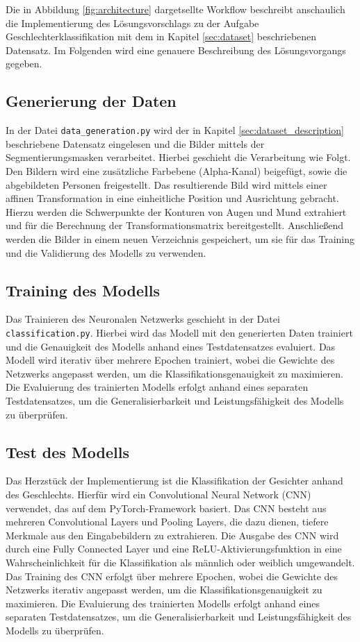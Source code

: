 \documentclass[journal,twoside,web]{ieeecolor}
\begin{document}
Die in Abbildung \ref{fig:architecture} dargetsellte Workflow beschreibt anschaulich die Implementierung des Lösungsvorschlags zu der Aufgabe Geschlechterklassifikation mit dem in Kapitel \ref{sec:dataset} beschriebenen Datensatz.
Im Folgenden wird eine genauere Beschreibung des Lösungsvorgangs gegeben.

\subsection{Generierung der Daten}
In der Datei \texttt{data\_generation.py} wird der in Kapitel \ref{sec:dataset_description} beschriebene Datensatz eingelesen und die Bilder mittels der Segmentierungsmasken verarbeitet. Hierbei geschieht die Verarbeitung wie Folgt. Den Bildern wird eine zusätzliche Farbebene (Alpha-Kanal) beigefügt, sowie die abgebildeten Personen freigestellt. Das resultierende Bild wird mittels einer affinen Transformation in eine einheitliche Position und Ausrichtung gebracht. Hierzu werden die Schwerpunkte der Konturen von Augen und Mund extrahiert und für die Berechnung der Transformationsmatrix bereitgestellt. Anschließend werden die Bilder in einem neuen Verzeichnis gespeichert, um sie für das Training und die Validierung des Modells zu verwenden.


\subsection{Training des Modells}
Das Trainieren des Neuronalen Netzwerks geschieht in der Datei \texttt{classification.py}. Hierbei wird das Modell mit den generierten Daten trainiert und die Genauigkeit des Modells anhand eines Testdatensatzes evaluiert. Das Modell wird iterativ über mehrere Epochen trainiert, wobei die Gewichte des Netzwerks angepasst werden, um die Klassifikationsgenauigkeit zu maximieren. Die Evaluierung des trainierten Modells erfolgt anhand eines separaten Testdatensatzes, um die Generalisierbarkeit und Leistungsfähigkeit des Modells zu überprüfen.

\subsection{Test des Modells}
Das Herzstück der Implementierung ist die Klassifikation der Gesichter anhand des Geschlechts. Hierfür wird ein Convolutional Neural Network (CNN) verwendet, das auf dem PyTorch-Framework basiert. Das CNN besteht aus mehreren Convolutional Layers und Pooling Layers, die dazu dienen, tiefere Merkmale aus den Eingabebildern zu extrahieren. Die Ausgabe des CNN wird durch eine Fully Connected Layer und eine ReLU-Aktivierungsfunktion in eine Wahrscheinlichkeit für die Klassifikation als männlich oder weiblich umgewandelt. Das Training des CNN erfolgt über mehrere Epochen, wobei die Gewichte des Netzwerks iterativ angepasst werden, um die Klassifikationsgenauigkeit zu maximieren. Die Evaluierung des trainierten Modells erfolgt anhand eines separaten Testdatensatzes, um die Generalisierbarkeit und Leistungsfähigkeit des Modells zu überprüfen.
\end{document}
